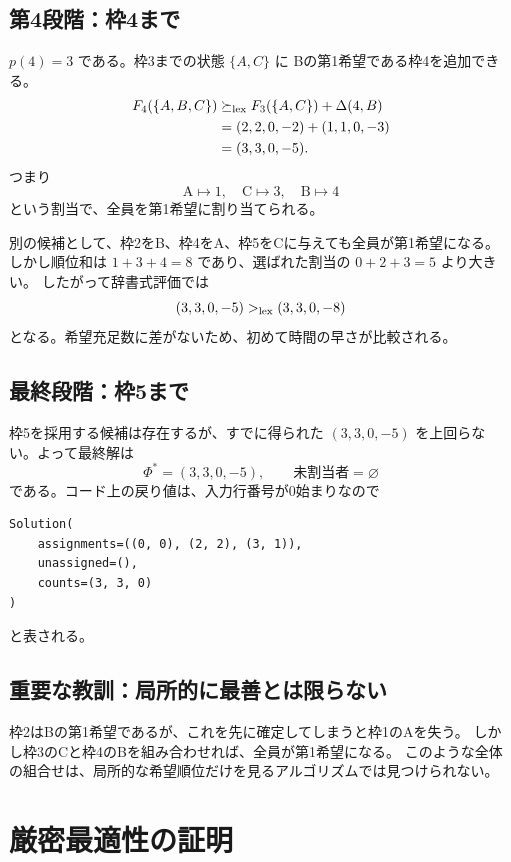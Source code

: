 \documentclass[11pt,a4paper]{ltjsarticle}
\theoremstyle{definition}
\theoremstyle{remark}
\begin{document}
\subsection{第4段階：枠4まで}
$p(4)=3$ である。枠3までの状態 $\{A,C\}$ に
Bの第1希望である枠4を追加できる。
\begin{align*}
 F_4(\{A,B,C\})
 &\succeq_{\rm lex}F_3(\{A,C\})+\Delta(4,B)\\
 &=(2,2,0,-2)+(1,1,0,-3)\\
 &=(3,3,0,-5).
\end{align*}
つまり
\[
 \boxed{\text{A}\mapsto1,\quad\text{C}\mapsto3,\quad\text{B}\mapsto4}
\]
という割当で、全員を第1希望に割り当てられる。

別の候補として、枠2をB、枠4をA、枠5をCに与えても全員が第1希望になる。
しかし順位和は $1+3+4=8$ であり、選ばれた割当の $0+2+3=5$ より大きい。
したがって辞書式評価では
\[
 (3,3,0,-5)>_{\rm lex}(3,3,0,-8)
\]
となる。希望充足数に差がないため、初めて時間の早さが比較される。

\subsection{最終段階：枠5まで}
枠5を採用する候補は存在するが、すでに得られた
$(3,3,0,-5)$ を上回らない。よって最終解は
\[
 \Phi^*=(3,3,0,-5),\qquad
 \text{未割当者}=\varnothing
\]
である。コード上の戻り値は、入力行番号が0始まりなので
\begin{Verbatim}[fontsize=\small,frame=single]
Solution(
    assignments=((0, 0), (2, 2), (3, 1)),
    unassigned=(),
    counts=(3, 3, 0)
)
\end{Verbatim}
と表される。

\subsection{重要な教訓：局所的に最善とは限らない}
枠2はBの第1希望であるが、これを先に確定してしまうと枠1のAを失う。
しかし枠3のCと枠4のBを組み合わせれば、全員が第1希望になる。
このような全体の組合せは、局所的な希望順位だけを見るアルゴリズムでは見つけられない。

\section{厳密最適性の証明}
\end{document}
